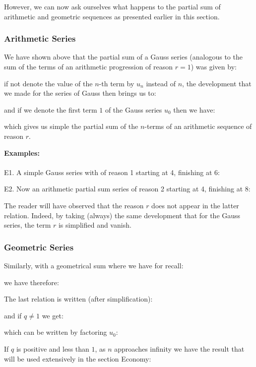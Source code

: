 	However, we can now ask ourselves what happens to the partial sum of arithmetic and geometric sequences as presented earlier in this section.
	\subsubsection{Arithmetic Series}
	We have shown above that the partial sum of a Gauss series (analogous to the sum of the terms of an arithmetic progression of reason $r = 1$) was given by:
	
	if not denote the value of the $n$-th term by $u_n$ instead of $n$, the development that we made for the series of Gauss then brings us to:
	
	and if we denote the first term $1$ of the Gauss series $u_0$ then we have:
	
	which gives us simple the partial sum of the $n$-terms of an arithmetic sequence of reason $r$.
	\begin{tcolorbox}[colframe=black,colback=white,sharp corners]
	\textbf{{\Large {}}Examples:}\\\\
	E1. A simple Gauss series with of reason 1 starting at 4, finishing at 6:
	
	E2. Now an arithmetic partial sum series of reason 2 starting at 4, finishing at 8:
	
	\end{tcolorbox}
	\begin{tcolorbox}[title=Remark,colframe=black,arc=10pt]
	The reader will have observed that the reason $r$ does not appear in the latter relation. Indeed, by taking (always) the same development that for the Gauss series, the term $r$ is simplified and vanish.
	\end{tcolorbox}
	
	\subsubsection{Geometric Series}\label{geometric series}
	Similarly, with a geometrical sum where we have for recall:
	
	we have therefore:
	
	The last relation is written (after simplification):
	
	and if $q\neq 1$ we get:
	
	which can be written by factoring $u_0$:
	
	If $q$ is positive and less than $1$, as $n$ approaches infinity we have the result that will be used extensively in the section Economy:
	
